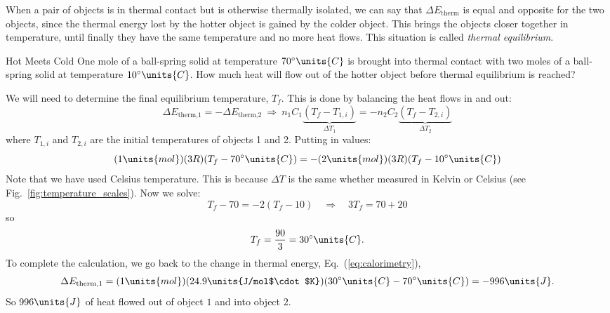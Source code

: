 When a pair of objects is in thermal contact but is otherwise thermally
isolated, we can say that $\Delta E_\text{therm}$ is equal and opposite
for the two objects, since the thermal energy lost by the hotter object
is gained by the colder object.  This brings the objects closer together
in temperature, until finally they have the same temperature and no more
heat flows.  This situation is called {\it thermal equilibrium}.

\begin{example}{Hot Meets Cold}
One mole of a ball-spring solid at temperature $70^\circ\units{C}$ is
brought into thermal contact with two moles of a ball-spring solid at
temperature $10^\circ\units{C}$.  How much heat will flow out of the
hotter object before thermal equilibrium is reached?
 
\solution 
We will need to
determine the final equilibrium temperature, $T_f$.  
This is done by balancing the heat flows in and out:
\begin{equation} 
\Delta
E_\text{therm,1} = -\Delta E_\text{therm,2} 
\>\Rightarrow\>
n_1 C_1 \underbrace{(T_f - T_{1,i})}_{\Delta T_1} = -n_2 C_2 
\underbrace{(T_f - T_{2,i}) }_{\Delta T_2}
\label{eq:calorimetry}
\end{equation}
where $T_{1,i}$ and $T_{2,i}$ are the initial temperatures of objects
1 and 2.  Putting in values:
\begin{equation}
(1\units{mol})(3R)(T_f - 70^\circ\units{C})
 = -(2\units{mol})(3R)(T_f - 10^\circ\units{C})
\end{equation}
Note that we have used Celsius temperature.  This is because $\Delta
T$ is the same whether measured in Kelvin or Celsius (see
Fig.~\ref{fig:temperature_scales}).  Now we solve:
\begin{equation}
T_f - 70 = -2(T_f-10)\quad\Rightarrow\quad 3T_f = 70+20
\end{equation}
so
\begin{equation}
T_f = \frac{90}{3} = 30^\circ\units{C}.
\end{equation}
To complete the calculation, we go back to the change in thermal energy,
Eq.~(\ref{eq:calorimetry}),
\begin{equation}
\Delta E_\text{therm,1} = (1\units{mol})(24.9\units{J/mol$\cdot$K})
(30^\circ\units{C} - 70^\circ\units{C}) = -996\units{J}.
\end{equation}
So $996\units{J}$ of heat flowed out of object $1$ and into object $2$.
\end{example}



